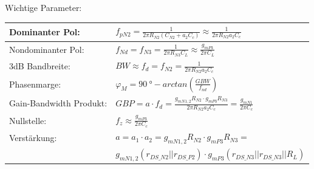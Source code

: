 \begin{minipage}[t]{0.7\textwidth}
	Wichtige Parameter:\\
	\begin{tabular}{|l|l|}
		\hline
		Dominanter Pol:&$f_{pN2}=\frac{1}{2\pi R_{N2}(C_{N2}+a_2C_c)}\approx\frac{1}{2\pi R_{N2}a_2C_c}$\\ \hline
		Nondominanter Pol:&$f_{Nd}=f_{N3}=\frac{1}{2\pi R_{N3}C_L}\approx\frac{g_{mP3}}{2\pi C_L}$\\ \hline
		3dB Bandbreite:&$BW\approx f_d=f_{N2}=\frac{1}{2\pi R_{N2}a_2C_c}$\\ \hline
		Phasenmarge:&$\varphi_M =\SI{90}{\degree}-arctan(\frac{GBW}{f_{nd}})$\\ \hline
		Gain-Bandwidth Produkt:&$GBP=a\cdot f_d=\frac{g_{mN1,2}R_{N2}\cdot g_{mP3}R_{N3}}{2\pi R_{N2}a_2C_c}=\frac{g_{mN1}}{2\pi C_c}$\\ \hline
		Nullstelle:&$f_z\approx\frac{g_{mP3}}{2\pi C_c}$\\ \hline
		Verstärkung:&$a=a_1\cdot a_2=g_{mN1,2}R_{N2}\cdot g_{mP3}R_{N3}=$\\
		&$g_{mN1,2}(r_{DS\_N2}||r_{DS\_P2})\cdot g_{mP3}(r_{DS\_N3}||r_{DS\_N3}||R_L)$\\ \hline
	\end{tabular}
\end{minipage}

